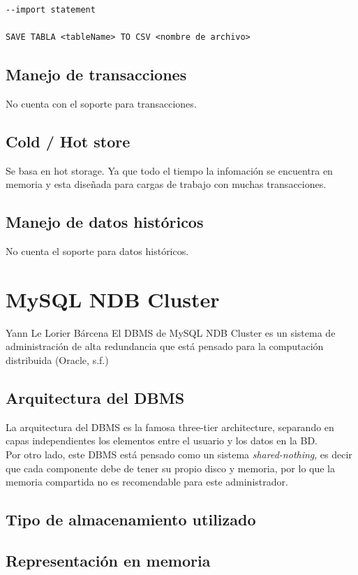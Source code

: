 \documentclass{acmart}
\begin{document}
\begin{verbatim}
--import statement

SAVE TABLA <tableName> TO CSV <nombre de archivo>
\end{verbatim}

\subsection{Manejo de transacciones}

No cuenta con el soporte para transacciones.

\subsection{Cold / Hot store}

Se basa en hot storage. Ya que todo el tiempo la infomación se encuentra en memoria y esta diseñada para cargas de trabajo con muchas transacciones.

\subsection{Manejo de datos históricos}

No cuenta el soporte para datos históricos.

\newpage

\section{MySQL NDB Cluster}
Yann Le Lorier Bárcena
El DBMS de MySQL NDB Cluster es un sistema de administración de alta redundancia que está pensado para la computación distribuida (Oracle, s.f.)
\subsection{Arquitectura del DBMS}
La arquitectura del DBMS es la famosa three-tier architecture, separando en capas independientes los elementos entre el usuario y los datos en la BD.\\
Por otro lado, este DBMS está pensado como un sistema \textit{shared-nothing}, es decir que cada componente debe de tener su propio disco y memoria, por lo que la memoria compartida no es recomendable para este administrador.
\subsection{Tipo de almacenamiento utilizado}
\subsection{Representación en memoria}
\end{document}
